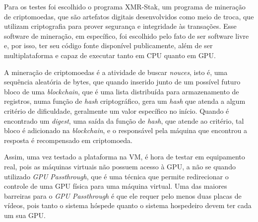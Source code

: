 Para os testes foi escolhido o programa XMR-Stak\cite{xmr_stak}, um programa de mineração de criptomoedas, que são artefatos digitais desenvolvidos como meio de troca, que utilizam criptografia para prover segurança e integridade às transações\cite{crypto_currencies}. Esse software de mineração, em específico, foi escolhido pelo fato de ser software livre e, por isso, ter seu código fonte disponível publicamente, além de ser multiplataforma e capaz de executar tanto em \acrshort{CPU} quanto em \acrshort{GPU}.

A mineração de criptomoedas é a atividade de buscar \textit{nouces}, isto é, uma sequência aleatória de bytes, que quando inserido junto de um possível futuro bloco de uma \textit{blockchain}, que é uma lista distribuída para armazenamento de registros, numa função de \textit{hash} criptográfico, gera um \textit{hash} que atenda a algum critério de dificuldade, geralmente um valor específico no início. Quando é encontrado um \textit{digest}, uma saída da função de \textit{hash}, que atende ao critério, tal bloco é adicionado na \textit{blockchain}, e o responsável pela máquina que encontrou a resposta é recompensado em criptomoeda.

Assim, uma vez testado a plataforma na \acrshort{VM}, é hora de testar em equipamento real, pois as máquinas virtuais não possuem acesso à \acrshort{GPU}, a não se quando utilizado \textit{\acrshort{GPU} Passthrough}, que é uma técnica que permite redirecionar o controle de uma \acrshort{GPU} física para uma máquina virtual. Uma das maiores barreiras para o \textit{\acrshort{GPU} Passthrough} é que ele requer pelo menos duas placas de vídeos, pois tanto o sistema hóspede quanto o sistema hospedeiro devem ter cada um sua \acrshort{GPU}.


